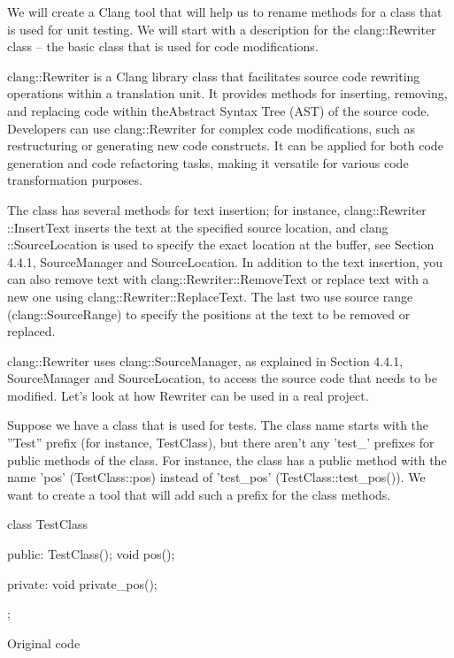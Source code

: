 We will create a Clang tool that will help us to rename methods for a class that is used for unit testing. We will start with a description for the clang::Rewriter class – the basic class that is used for code modifications.



clang::Rewriter is a Clang library class that facilitates source code rewriting operations within a translation unit. It provides methods for inserting, removing, and replacing code within theAbstract Syntax Tree (AST) of the source code. Developers can use clang::Rewriter for complex code modifications, such as restructuring or generating new code constructs. It can be applied for both code generation and code refactoring tasks, making it versatile for various code transformation purposes.

The class has several methods for text insertion; for instance, clang::Rewriter ::InsertText inserts the text at the specified source location, and clang ::SourceLocation is used to specify the exact location at the buffer, see Section 4.4.1, SourceManager and SourceLocation. In addition to the text insertion, you can also remove text with clang::Rewriter::RemoveText or replace text with a new one using clang::Rewriter::ReplaceText. The last two use source range (clang::SourceRange) to specify the positions at the text to be removed or replaced.

clang::Rewriter uses clang::SourceManager, as explained in Section 4.4.1, SourceManager and SourceLocation, to access the source code that needs to be modified. Let’s look at how Rewriter can be used in a real project.


Suppose we have a class that is used for tests. The class name starts with the ”Test” prefix (for instance, TestClass), but there aren’t any ’test\_’ prefixes for public methods of the class. For instance, the class has a public method with the name ’pos’ (TestClass::pos) instead of ’test\_pos’ (TestClass::test\_pos()). We want to create a tool that will add such a prefix for the class methods.

\begin{cpp}
class TestClass {
public:
  TestClass(){};
  void pos(){};

private:
  void private_pos(){};
};
\end{cpp}

Original code

